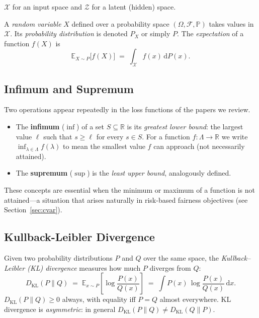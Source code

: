 $\mathcal{X}$ for an input space and $\mathcal{Z}$ for a latent
(hidden) space.

A \emph{random variable} $X$ defined over a probability space
$(\Omega,\mathcal{F},\mathbb{P})$ takes values in $\mathcal{X}$.
Its \emph{probability distribution} is denoted $P_X$ or simply $P$.
The \emph{expectation} of a function $f(X)$ is
\[
  \mathbb{E}_{X \sim P}\bigl[f(X)\bigr]
  \;=\; \int_{\mathcal{X}} f(x)\,\mathrm{d}P(x).
\]

\subsection{Infimum and Supremum}
\label{subsec:inf_sup}

Two operations appear repeatedly in the loss functions of the papers
we review.

\begin{itemize}
  \item The \textbf{infimum} ($\inf$) of a set $S \subseteq \mathbb{R}$
        is its \emph{greatest lower bound}: the largest value $\ell$
        such that $s \geq \ell$ for every $s \in S$.  For a
        function $f:\Lambda \to \mathbb{R}$ we write
        $\inf_{\lambda \in \Lambda} f(\lambda)$ to mean
        the smallest value $f$ can approach (not necessarily attained).
  \item The \textbf{supremum} ($\sup$) is the \emph{least upper bound},
        analogously defined.
\end{itemize}

\noindent
These concepts are essential when the minimum or maximum of a
function is not attained—a situation that arises naturally in
risk-based fairness objectives (see Section~\ref{sec:cvar}).

\subsection{Kullback-Leibler Divergence}
\label{subsec:kl}

Given two probability distributions $P$ and $Q$ over the same space,
the \emph{Kullback–Leibler (KL) divergence} measures how much $P$
diverges from $Q$:
\begin{equation}
  D_{\mathrm{KL}}(P \| Q)
  \;=\; \mathbb{E}_{x \sim P}
        \!\left[\log \frac{P(x)}{Q(x)}\right]
  \;=\; \int P(x)\,\log \frac{P(x)}{Q(x)}\,\mathrm{d}x.
  \label{eq:kl_divergence}
\end{equation}
$D_{\mathrm{KL}}(P \| Q) \geq 0$ always, with equality iff $P = Q$
almost everywhere.  KL divergence is \emph{asymmetric}: in general
$D_{\mathrm{KL}}(P\|Q) \neq D_{\mathrm{KL}}(Q\|P)$.

